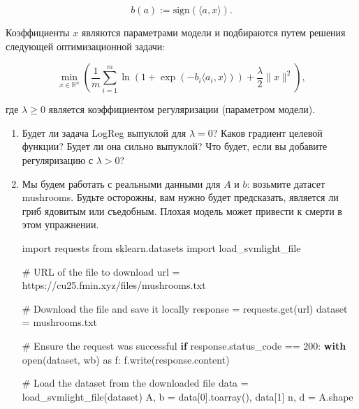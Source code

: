 \documentclass[
  russian,
  letterpaper,
  DIV=11,
  numbers=noendperiod]{scrartcl}
\newenvironment{Shaded}{\begin{snugshade}}{\end{snugshade}}
\newcommand{\BuiltInTok}[1]{\textcolor[rgb]{0.00,0.23,0.31}{#1}}
\newcommand{\CommentTok}[1]{\textcolor[rgb]{0.37,0.37,0.37}{#1}}
\newcommand{\ControlFlowTok}[1]{\textcolor[rgb]{0.00,0.23,0.31}{\textbf{#1}}}
\newcommand{\DecValTok}[1]{\textcolor[rgb]{0.68,0.00,0.00}{#1}}
\newcommand{\ImportTok}[1]{\textcolor[rgb]{0.00,0.46,0.62}{#1}}
\newcommand{\NormalTok}[1]{\textcolor[rgb]{0.00,0.23,0.31}{#1}}
\newcommand{\OperatorTok}[1]{\textcolor[rgb]{0.37,0.37,0.37}{#1}}
\newcommand{\StringTok}[1]{\textcolor[rgb]{0.13,0.47,0.30}{#1}}
\begin{document}
\begin{enumerate}
  \[
   b(a) := \text{sign}(\langle a, x \rangle).
   \]

  Коэффициенты \(x\) являются параметрами модели и подбираются путем
  решения следующей оптимизационной задачи:

  \[
   \tag{LogReg}
   \min_{x \in \mathbb{R}^n} \left( \frac{1}{m} \sum_{i=1}^m \ln(1 + \exp(-b_i \langle a_i, x \rangle)) + \frac{\lambda}{2} \|x\|^2 \right),
   \]

  где \(\lambda \geq 0\) является коэффициентом регуляризации
  (параметром модели).

  \begin{enumerate}
  \def\labelenumii{\arabic{enumii}.}
  \item
    Будет ли задача LogReg выпуклой для \(\lambda = 0\)? Каков градиент
    целевой функции? Будет ли она сильно выпуклой? Что будет, если вы
    добавите регуляризацию с \(\lambda > 0\)?
  \item
    Мы будем работать с реальными данными для \(A\) и \(b\): возьмите
    датасет mushrooms. Будьте осторожны, вам нужно будет предсказать,
    является ли гриб ядовитым или съедобным. Плохая модель может
    привести к смерти в этом упражнении.

\begin{Shaded}
\begin{Highlighting}[]
\ImportTok{import}\NormalTok{ requests}
\ImportTok{from}\NormalTok{ sklearn.datasets }\ImportTok{import}\NormalTok{ load\_svmlight\_file}

\CommentTok{\# URL of the file to download}
\NormalTok{url }\OperatorTok{=} \StringTok{\textquotesingle{}https://cu25.fmin.xyz/files/mushrooms.txt\textquotesingle{}}

\CommentTok{\# Download the file and save it locally}
\NormalTok{response }\OperatorTok{=}\NormalTok{ requests.get(url)}
\NormalTok{dataset }\OperatorTok{=} \StringTok{\textquotesingle{}mushrooms.txt\textquotesingle{}}

\CommentTok{\# Ensure the request was successful}
\ControlFlowTok{if}\NormalTok{ response.status\_code }\OperatorTok{==} \DecValTok{200}\NormalTok{:}
    \ControlFlowTok{with} \BuiltInTok{open}\NormalTok{(dataset, }\StringTok{\textquotesingle{}wb\textquotesingle{}}\NormalTok{) }\ImportTok{as}\NormalTok{ f:}
\NormalTok{        f.write(response.content)}

    \CommentTok{\# Load the dataset from the downloaded file}
\NormalTok{    data }\OperatorTok{=}\NormalTok{ load\_svmlight\_file(dataset)}
\NormalTok{    A, b }\OperatorTok{=}\NormalTok{ data[}\DecValTok{0}\NormalTok{].toarray(), data[}\DecValTok{1}\NormalTok{]}
\NormalTok{    n, d }\OperatorTok{=}\NormalTok{ A.shape}


\end{Highlighting}
\end{Shaded}
\end{enumerate}
\end{enumerate}
\end{document}
